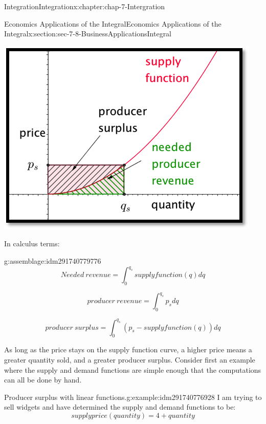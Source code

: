 \documentclass[oneside,10pt,]{book}
\numberwithin{equation}{section}
\begin{document}
\begin{chapterptx}{Integration}{}{Integration}{}{}{x:chapter:chap-7-Intergration}
\begin{sectionptx}{Economics Applications of the Integral}{}{Economics Applications of the Integral}{}{}{x:section:sec-7-8-BusinessApplicationsIntegral}
\begin{sidebyside}{1}{0.25}{0.25}{0}%
\begin{sbspanel}{0.5}%
\includegraphics[width=\linewidth]{images/sec7-8-3.png}
\end{sbspanel}%
\end{sidebyside}%
\par
In calculus terms:%
\begin{assemblage}{}{g:assemblage:idm291740779776}%
%
\begin{equation*}
Needed\ revenue= \int_0^{q_s} supply function(q) dq
\end{equation*}
%
\par
%
\begin{equation*}
producer\ revenue= \int_0^{q_s} p_s  dq
\end{equation*}
%
\par
%
\begin{equation*}
producer\ surplus= \int_0^{q_s} ( p_s-supply function(q))  dq
\end{equation*}
%
\end{assemblage}
As long as the price stays on the supply function curve, a higher price means a greater quantity sold, and a greater producer surplus.    Consider first an example where the supply and demand functions are simple enough that the computations can all be done by hand.%
\begin{example}{Producer surplus with linear functions.}{g:example:idm291740776928}%
I am trying to sell widgets and have determined the supply and demand functions to be:%
%
\begin{equation*}
supply price(quantity)=4+quantity

\end{equation*}
\end{example}
\end{sectionptx}
\end{chapterptx}
\end{document}
